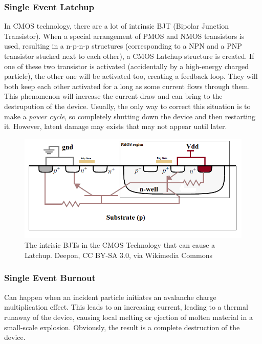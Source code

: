 \subsubsection{Single Event Latchup}
In CMOS technology, there are a lot of intrinsic BJT (Bipolar Junction Transistor). When a special arrangement of PMOS and NMOS transistors is used, resulting in a n-p-n-p structures (corresponding to a NPN and a PNP transistor stucked next to each other), a CMOS Latchup structure is created. If one of these two transistor is activated (accidentally by a high-energy charged particle), the other one will be activated too, creating a feedback loop. They will both keep each other activated for a long as some current flows through them. This phenomenon will increase the current draw and can bring to the destrupution of the device. Usually, the only way to correct this situation is to make a \textit{power cycle}, so completely shutting down the device and then restarting it. However, latent damage may exists that may not appear until later. \bigskip

\begin{figure}[H]
\centering
\includegraphics[width=1.0\linewidth]{images/chapter2/Latchup.png}
\caption{The intrisic BJTs in the CMOS Technology that can cause a Latchup. Deepon, CC BY-SA 3.0, via Wikimedia Commons}
\label{fig:latchup}
\end{figure}

\subsubsection{Single Event Burnout}
Can happen when an incident particle initiates an avalanche charge multiplication effect. This leads to an increasing current, leading to a thermal runaway of the device, causing local melting or ejection of molten material in a small-scale explosion. Obviously, the result is a complete destruction of the device. \bigskip

